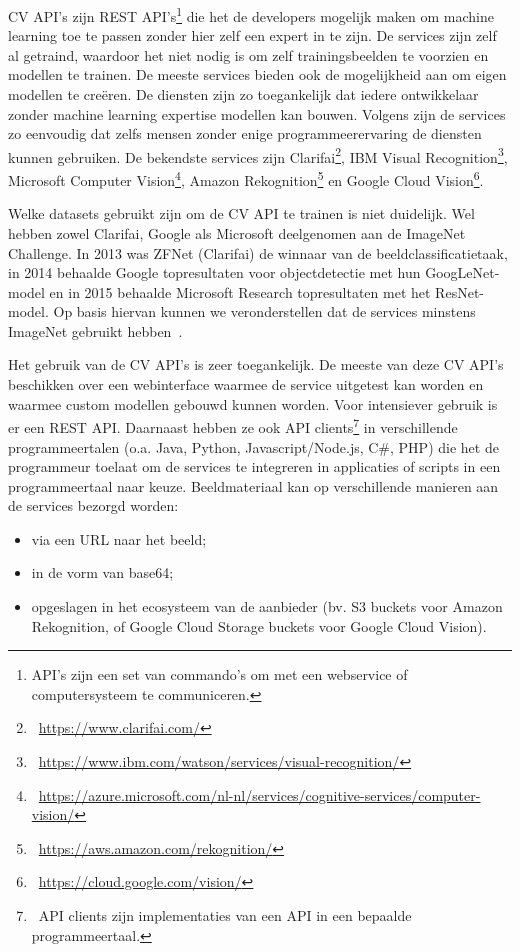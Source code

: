 CV API’s zijn REST API’s\footnote{API's zijn een set van commando's om met een webservice of computersysteem te communiceren.} die het de developers mogelijk maken om machine learning toe te passen zonder hier zelf een expert in te zijn.  De services zijn zelf al getraind, waardoor het niet nodig is om zelf trainingsbeelden te voorzien en modellen te trainen. De meeste services bieden ook de mogelijkheid aan om eigen modellen te cre\"{e}ren. De diensten zijn zo toegankelijk dat iedere ontwikkelaar zonder machine learning expertise modellen kan bouwen. Volgens \textcite{Lardinois2018} zijn de services zo eenvoudig dat zelfs mensen zonder enige programmeerervaring de diensten kunnen gebruiken. De bekendste services zijn Clarifai\footnote{~\url{https://www.clarifai.com/}}, IBM Visual Recognition\footnote{~\url{https://www.ibm.com/watson/services/visual-recognition/}}, Microsoft Computer Vision\footnote{~\url{https://azure.microsoft.com/nl-nl/services/cognitive-services/computer-vision/}}, Amazon Rekognition\footnote{~\url{https://aws.amazon.com/rekognition/}} en Google Cloud Vision\footnote{~\url{https://cloud.google.com/vision/}}. 

Welke datasets gebruikt zijn om de CV API te trainen is niet duidelijk. Wel hebben zowel Clarifai, Google als Microsoft deelgenomen aan de ImageNet Challenge. In 2013 was ZFNet (Clarifai) de winnaar van de beeldclassificatietaak, in 2014 behaalde Google topresultaten voor objectdetectie met hun GoogLeNet-model en in 2015 behaalde Microsoft Research topresultaten met het ResNet-model. Op basis hiervan kunnen we veronderstellen dat de services minstens ImageNet gebruikt hebben~\autocite{Brownlee2019a}.

Het gebruik van de CV API’s is zeer toegankelijk. De meeste van deze CV API’s beschikken over een webinterface waarmee de service uitgetest kan worden en waarmee custom modellen gebouwd kunnen worden. Voor intensiever gebruik is er een REST API. Daarnaast hebben ze ook API clients\footnote{~API clients zijn implementaties van een API in een bepaalde programmeertaal.} in verschillende programmeertalen (o.a. Java, Python, Javascript/Node.js, C\#, PHP) die het de programmeur toelaat om de services te integreren in applicaties of scripts in een programmeertaal naar keuze. Beeldmateriaal kan op verschillende manieren aan de services bezorgd worden:
\begin{itemize}
	\item via een URL naar het beeld;
	\item in de vorm van base64;
	\item opgeslagen in het ecosysteem van de aanbieder (bv. S3 buckets voor Amazon Rekognition, of Google Cloud Storage buckets voor Google Cloud Vision).
\end{itemize}

